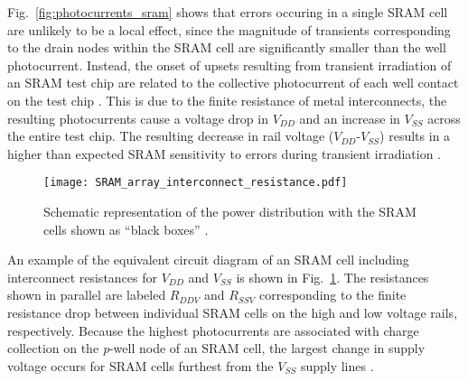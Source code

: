 Fig.~\ref{fig:photocurrents_sram} shows that errors occuring in a single SRAM cell are unlikely to be a local effect, since the magnitude of transients corresponding to the drain nodes within the SRAM cell are significantly smaller than the well photocurrent.
Instead, the onset of upsets resulting from transient irradiation of an SRAM test chip are related to the collective photocurrent of each well contact on the test chip \cite{Massengill:1984hn}.
This is due to the finite resistance of metal interconnects, the resulting photocurrents cause a voltage drop in $V_{DD}$ and an increase in $V_{SS}$ across the entire test chip. 
The resulting decrease in rail voltage ($V_{DD}$-$V_{SS}$) results in a higher than expected SRAM sensitivity to errors during transient irradiation \cite{Massengill:1984hn}.
\begin{figure}[htbp]
    \begin{center}
        \texttt{[image: SRAM\_array\_interconnect\_resistance.pdf]}
    \end{center}
    \caption[Schematic representation of the power distribution with the SRAM cells shown as ``black boxes''.]{Schematic representation of the power distribution with the SRAM cells shown as ``black boxes'' \cite{Massengill:1984hn}.}
    \label{fig:array_inter_resist}
\end{figure}
An example of the equivalent circuit diagram of an SRAM cell including interconnect resistances for $V_{DD}$ and $V_{SS}$ is shown in Fig.~\ref{fig:array_inter_resist}.
The resistances shown in parallel are labeled $R_{DDV}$ and $R_{SSV}$ corresponding to the finite resistance drop between individual SRAM cells on the high and low voltage rails, respectively.
Because the highest photocurrents are associated with charge collection on the \emph{p}-well node of an SRAM cell, the largest change in supply voltage occurs for SRAM cells furthest from the $V_{SS}$ supply lines \cite{Massengill:1984hn,Massengill:1985gd,Massengill:1986kp}.

